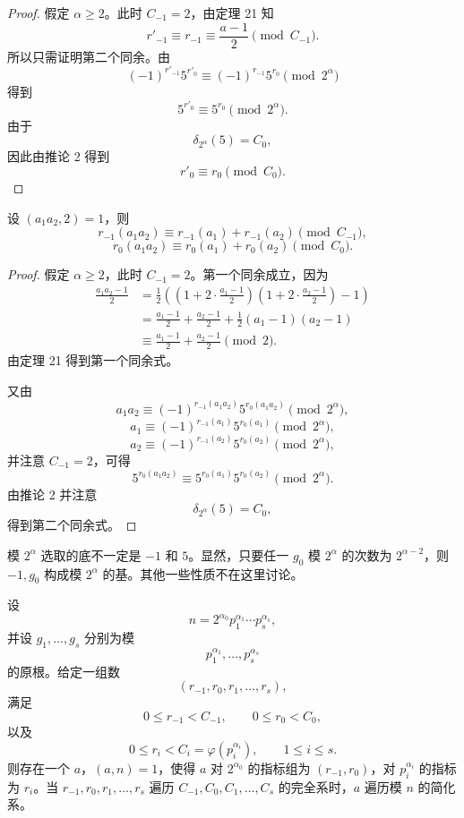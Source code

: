 \begin{proof}
	假定 $\alpha\geq 2$。此时 $C_{-1}=2$，由定理 21 知
	\[
		r'_{-1}\equiv r_{-1}\equiv \frac{a-1}{2}\pmod {C_{-1}}.
	\]
	所以只需证明第二个同余。由
	\[
		(-1)^{r'_{-1}}5^{r'_0}
		\equiv
		(-1)^{r_{-1}}5^{r_0}
		\pmod {2^\alpha}
	\]
	得到
	\[
		5^{r'_0}\equiv 5^{r_0}\pmod {2^\alpha}.
	\]
	由于
	\[
		\delta_{2^\alpha}(5)=C_0,
	\]
	因此由推论 2 得到
	\[
		r'_0\equiv r_0\pmod {C_0}.
	\]
\end{proof}

\begin{theorem}[原文 定理 23]
	设 $(a_1a_2,2)=1$，则
	\[
		r_{-1}(a_1a_2)
		\equiv
		r_{-1}(a_1)+r_{-1}(a_2)
		\pmod {C_{-1}},
	\]
	\[
		r_0(a_1a_2)
		\equiv
		r_0(a_1)+r_0(a_2)
		\pmod {C_0}.
	\]
\end{theorem}

\begin{proof}
	假定 $\alpha\geq 2$，此时 $C_{-1}=2$。第一个同余成立，因为
	\[
	\begin{aligned}
		\frac{a_1a_2-1}{2}
		&=
		\frac12\left(
		\left(1+2\cdot\frac{a_1-1}{2}\right)
		\left(1+2\cdot\frac{a_2-1}{2}\right)-1
		\right)\\
		&=
		\frac{a_1-1}{2}
		+
		\frac{a_2-1}{2}
		+
		\frac12(a_1-1)(a_2-1)\\
		&\equiv
		\frac{a_1-1}{2}
		+
		\frac{a_2-1}{2}
		\pmod 2.
	\end{aligned}
	\]
	由定理 21 得到第一个同余式。

	又由
	\[
		a_1a_2\equiv (-1)^{r_{-1}(a_1a_2)}5^{r_0(a_1a_2)}\pmod {2^\alpha},
	\]
	\[
		a_1\equiv (-1)^{r_{-1}(a_1)}5^{r_0(a_1)}\pmod {2^\alpha},
	\]
	\[
		a_2\equiv (-1)^{r_{-1}(a_2)}5^{r_0(a_2)}\pmod {2^\alpha},
	\]
	并注意 $C_{-1}=2$，可得
	\[
		5^{r_0(a_1a_2)}
		\equiv
		5^{r_0(a_1)}5^{r_0(a_2)}
		\pmod {2^\alpha}.
	\]
	由推论 2 并注意
	\[
		\delta_{2^\alpha}(5)=C_0,
	\]
	得到第二个同余式。
\end{proof}

模 $2^\alpha$ 选取的底不一定是 $-1$ 和 $5$。显然，只要任一 $g_0$ 模 $2^\alpha$ 的次数为 $2^{\alpha-2}$，则 $-1,g_0$ 构成模 $2^\alpha$ 的基。其他一些性质不在这里讨论。

\begin{theorem}[原文 定理 24]
	设
	\[
		n=2^{\alpha_0}p_1^{\alpha_1}\cdots p_s^{\alpha_s},
	\]
	并设 $g_1,\ldots,g_s$ 分别为模
	\[
		p_1^{\alpha_1},\ldots,p_s^{\alpha_s}
	\]
	的原根。给定一组数
	\[
		(r_{-1},r_0,r_1,\ldots,r_s),
	\]
	满足
	\[
		0\leq r_{-1}<C_{-1},\qquad
		0\leq r_0<C_0,
	\]
	以及
	\[
		0\leq r_i<C_i=\varphi(p_i^{\alpha_i}),
		\qquad 1\leq i\leq s.
	\]
	则存在一个 $a$，$(a,n)=1$，使得 $a$ 对 $2^{\alpha_0}$ 的指标组为 $(r_{-1},r_0)$，对 $p_i^{\alpha_i}$ 的指标为 $r_i$。当 $r_{-1},r_0,r_1,\ldots,r_s$ 遍历 $C_{-1},C_0,C_1,\ldots,C_s$ 的完全系时，$a$ 遍历模 $n$ 的简化系。
\end{theorem}

